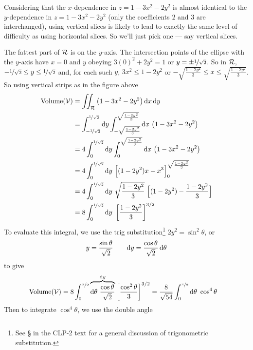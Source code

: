 \begin{eg}
Considering that the $x$-dependence in $z=1-3x^2-2y^2$
is almost identical to the $y$-dependence in $z=1-3x^2-2y^2$
(only the coefficients $2$ and $3$ are interchanged), using
vertical slices is likely to lead to exactly the same level of difficulty
as using horizontal slices. So we'll just pick one --- say vertical
slices.

The fattest part of $\mathcal{R}$ is on the $y$-axis. The intersection
points of the ellipse with the $y$-axis have $x=0$ and $y$
obeying $3(0)^2+2y^2 =1 $ or $y=\pm\nicefrac{1}{\sqrt{2}}$. So
in $\mathcal{R}$, $-\nicefrac{1}{\sqrt{2}}\le y\le \nicefrac{1}{\sqrt{2}}$
and, for each such $y$, $3x^2\le 1-2y^2$ or 
$-\sqrt{\frac{1-2y^2}{3}}\le x\le \sqrt{\frac{1-2y^2}{3}}$.
So using vertical strips as in the figure above
\begin{align*}
\text{Volume}(\cV) &=\dblInt_\cR \big(1-3x^2-2y^2\big)\,\dee{x}\,\dee{y} \\
   &=\int_{-\nicefrac{1}{\sqrt{2}}}^{\nicefrac{1}{\sqrt{2}}}\dee{y}
     \int_{-\sqrt{\frac{1-2y^2}{3}}}^{\sqrt{\frac{1-2y^2}{3}}}\dee{x}\ 
             \big(1-3x^2-2y^2\big) \\
   &=4\int_0^{\nicefrac{1}{\sqrt{2}}}\dee{y}
      \int_0^{\sqrt{\frac{1-2y^2}{3}}}\dee{x}\ 
             \big(1-3x^2-2y^2\big) \\
   &=4\int_0^{\nicefrac{1}{\sqrt{2}}}\dee{y}\ 
             \Big[(1-2y^2)x-x^3\Big]_0^{\sqrt{\frac{1-2y^2}{3}}} \\
   &=4\int_0^{\nicefrac{1}{\sqrt{2}}}\dee{y}\ 
             \sqrt{\frac{1-2y^2}{3}}\ \Big[(1-2y^2)-\frac{1-2y^2}{3}\Big] \\
   &=8\int_0^{\nicefrac{1}{\sqrt{2}}}\dee{y}\ 
             \left[\frac{1-2y^2}{3}\right]^{3/2} 
\end{align*}
To evaluate this integral, we use the trig 
substitution\footnote{See \S\eref{CLP101}{sec trigsub} in the CLP-2 text
for a general discussion of trigonometric substitution.}
$2y^2=\sin^2\theta$, or 
\begin{equation*}
y=\frac{\sin\theta}{\sqrt{2}}\qquad
\mathrm{d}y=\frac{\cos\theta}{\sqrt{2}}\,\mathrm{d}\theta
\end{equation*}
to give
\begin{align*} 
\text{Volume}(\cV) &= 8\int_0^{\nicefrac{\pi}{2}}
          \overbrace{\dee{\theta}\ \frac{\cos\theta}{\sqrt{2}} }^{\dee{y}}
           \left[\frac{\cos^2\theta}{3}\right]^{3/2} 
    =\frac{8}{\sqrt{54}}\int_0^{\nicefrac{\pi}{2}}\dee{\theta}\ 
                      \cos^4\theta
\end{align*}
Then to integrate $\cos^4\theta$, we use the double angle 

\end{eg}
